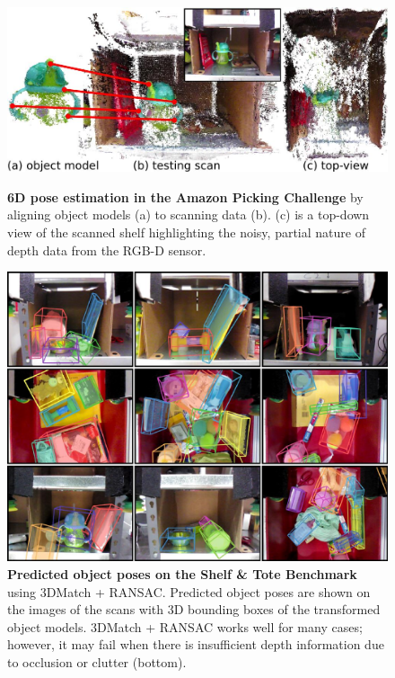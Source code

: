 \documentclass[10pt,twocolumn,letterpaper]{article}
\begin{document}
\begin{figure}[t]
\vspace{-2mm}
\centering
\includegraphics[width=1\linewidth]{images/apc-matching.jpg}
\caption{\textbf{6D pose estimation in the Amazon Picking Challenge} by aligning object models (a) to scanning data (b). (c) is a top-down view of the scanned shelf highlighting the noisy, partial nature of depth data from the RGB-D sensor.}%
\label{fig:apc-matching-problem}
\vspace{2mm}

\centering
\includegraphics[width=1\linewidth]{images/apc-examples.jpg}
\caption{\textbf{Predicted object poses on the Shelf \& Tote Benchmark} using 3DMatch + RANSAC. Predicted object poses are shown on the images of the scans with 3D bounding boxes of the transformed object models. 3DMatch + RANSAC works well for many cases; however, it may fail when there is insufficient depth information due to occlusion or clutter (bottom).}
\label{fig:apc-matching-results}
\end{figure}
\end{document}
